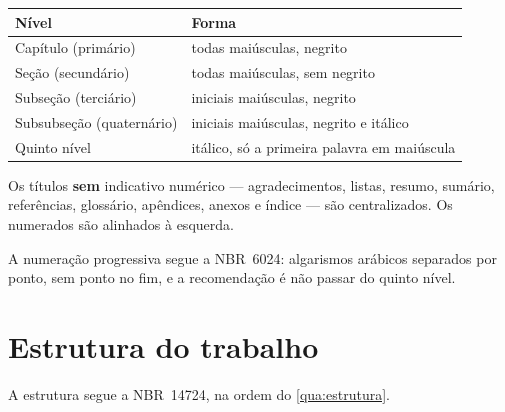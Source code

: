\documentclass[dsc]{ufrj}
\begin{document}
  \begin{framefloat}[ht]
    \centering
    \caption{Destaque gradativo dos títulos de seção}
    \label{qua:titulos}
    \begin{tabular}{|l|l|}
      \hline
      \textbf{Nível} & \textbf{Forma} \\
      \hline
      Capítulo (primário) & todas maiúsculas, negrito \\
      \hline
      Seção (secundário) & todas maiúsculas, sem negrito \\
      \hline
      Subseção (terciário) & iniciais maiúsculas, negrito \\
      \hline
      Subsubseção (quaternário) & iniciais maiúsculas, negrito e itálico \\
      \hline
      Quinto nível & itálico, só a primeira palavra em maiúscula \\
      \hline
    \end{tabular}
  \end{framefloat}

  Os títulos \textbf{sem} indicativo numérico --- agradecimentos, listas, resumo,
  sumário, referências, glossário, apêndices, anexos e índice --- são
  centralizados. Os numerados são alinhados à esquerda.

  A numeração progressiva segue a \mbox{NBR~6024}: algarismos arábicos separados
  por ponto, sem ponto no fim, e a recomendação é não passar do quinto nível.

  \chapter{Estrutura do trabalho}

  A estrutura segue a \mbox{NBR~14724}, na ordem do \autoref{qua:estrutura}.
\end{document}
